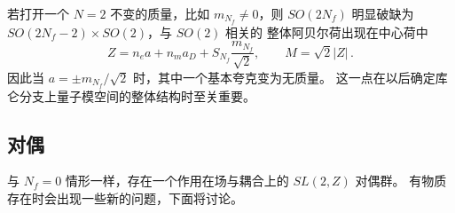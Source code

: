
若打开一个 $N = 2$ 不变的质量，比如 $m_{N_f} \not= 0$，则
$SO(2N_f)$ 明显破缺为 $SO(2N_f-2) \times SO(2)$，与 $SO(2)$ 相关的
整体阿贝尔荷出现在中心荷中
$$
Z = n_e a + n_m a_D +S_{N_f} \frac{m_{N_f}}{\sqrt{2}},\qquad
M = \sqrt{2} |Z|\,.
$$
因此当 $a = \pm m_{N_f} / \sqrt{2}$ 时，其中一个基本夸克变为无质量。
这一点在以后确定库仑分支上量子模空间的整体结构时至关重要。


\subsection{对偶}

与 $N_f=0$ 情形一样，存在一个作用在场与耦合上的 $SL(2,Z)$ 对偶群。
有物质存在时会出现一些新的问题，下面将讨论。

